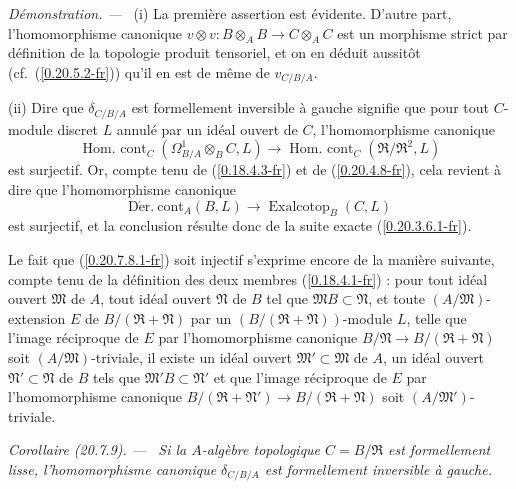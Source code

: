 \documentclass[10pt,oneside]{book}
\makeatletter
\newcommand{\sref}[1]{(\ref{#1})}
\newcommand{\setmanualcurrentlabel}[1]{\def\@currentlabel{#1}}
\newcommand{\oldpage}[2][]{%
  \setcounter{footnote}{0}%
  \marginpar{\scriptsize\textbf{#1}~|~#2}\ignorespaces}
\newenvironment{corollary}[1][]{%
  \setmanualcurrentlabel{#1}\par\medskip\noindent\itshape Corollaire (#1). ---\ }{\par}
\newenvironment{proof}{%
  \par\medskip\noindent\textit{Démonstration. ---\ }}{\par}
\makeatother
\begin{document}
\begin{proof}
(i) La première assertion est évidente. D'autre part, l'homomorphisme
canonique $v\otimes v:B\otimes_A B\to C\otimes_A C$ est un morphisme strict
par définition de la topologie produit tensoriel, et on en déduit aussitôt
(cf.\ \sref{0.20.5.2-fr}) qu'il en est de même de $v_{C/B/A}$.

(ii) Dire que $\delta_{C/B/A}$ est formellement inversible à gauche signifie
que pour tout $C$-module discret $L$ annulé par un idéal ouvert de $C$,
l'homomorphisme canonique
\[
  \operatorname{Hom.\ cont}_C(\Omega^1_{B/A}\otimes_B C,L)\to
  \operatorname{Hom.\ cont}_C(\mathfrak{R}/\mathfrak{R}^2,L)
\]
est surjectif. Or, compte tenu de \sref{0.18.4.3-fr} et de
\sref{0.20.4.8-fr}, cela revient à dire que l'homomorphisme canonique
\[
  \operatorname{D\acute{e}r.\ cont}_A(B,L)\to
  \operatorname{Exalcotop}_B(C,L)
\]
est surjectif, et la conclusion résulte donc de la suite exacte
\sref{0.20.3.6.1-fr}.

Le fait que \sref{0.20.7.8.1-fr} soit injectif s'exprime encore de la manière
suivante, compte tenu de la définition des deux membres
\sref{0.18.4.1-fr} : pour tout idéal ouvert $\mathfrak{M}$ de $A$, tout idéal
ouvert $\mathfrak{N}$ de $B$ tel que $\mathfrak{M}B\subset\mathfrak{N}$, et
toute $(A/\mathfrak{M})$-extension $E$ de
$B/(\mathfrak{R}+\mathfrak{N})$ par un
$(B/(\mathfrak{R}+\mathfrak{N}))$-module $L$, telle que l'image réciproque de
$E$ par l'homomorphisme canonique
$B/\mathfrak{N}\to B/(\mathfrak{R}+\mathfrak{N})$ soit
$(A/\mathfrak{M})$-triviale, il existe un idéal ouvert
$\mathfrak{M}'\subset\mathfrak{M}$ de $A$,
\oldpage[0\textsubscript{IV-1}]{150}
un idéal ouvert $\mathfrak{N}'\subset\mathfrak{N}$ de $B$ tels que
$\mathfrak{M}'B\subset\mathfrak{N}'$ et que l'image réciproque de $E$ par
l'homomorphisme canonique
$B/(\mathfrak{R}+\mathfrak{N}')\to B/(\mathfrak{R}+\mathfrak{N})$ soit
$(A/\mathfrak{M}')$-triviale.
\end{proof}

\begin{corollary}[20.7.9]
\label{0.20.7.9-fr}
Si la $A$-algèbre topologique $C=B/\mathfrak{R}$ est formellement lisse,
l'homomorphisme canonique $\delta_{C/B/A}$ est formellement inversible à
gauche.
\end{corollary}
\end{document}
